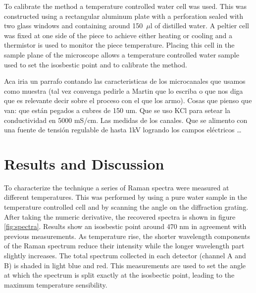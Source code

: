 \documentclass[twocolumn]{svjour3}       %
\begin{document}
To calibrate the method a temperature controlled water cell was used. This was constructed using a rectangular aluminum plate with a perforation sealed with two glass windows and containing around 150~$\mu$l of distilled water. A peltier cell was fixed at one side of the piece to achieve either heating or cooling and a thermistor is used to monitor the piece temperature.  Placing this cell in the sample plane of the microscope allows a temperature controlled water sample used to set the isosbestic point and to calibrate the method. 

Aca iria un parrafo contando las caracteristicas de los microcanales que usamos como muestra (tal vez convenga pedirle a Martin que lo escriba o que nos diga que es relevante decir sobre el proceso con el que los armo). Cosas que pienso que van: que están pegados a cubres de 150 um. Que se uso KCl para setear la conductividad en 5000 mS/cm. Las medidas de los canales. Que se alimento con una fuente de tensión regulable de hasta 1kV logrando los campos eléctricos …



\section{Results and Discussion}

To characterize the technique a series of Raman spectra were measured at different temperatures. This was performed by using a pure water sample in the temperature controlled cell and by scanning the angle on the diffraction grating. After taking the numeric derivative, the recovered spectra is shown in figure \ref{fig:spectra}. Results show an isosbestic point around 470 nm in agreement with previous measurements\cite{walrafen1}. As temperature rise, the shorter wavelength components of the Raman spectrum reduce their intensity while the longer wavelength part slightly increases. The total spectrum collected in each detector (channel A and B) is shaded in light blue and red. This measurements are used to set the angle at which the spectrum is split exactly at the isosbectic point, leading to the maximum temperature sensibility. 
\end{document}
